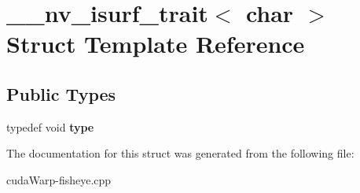 \hypertarget{struct____nv__isurf__trait_3_01char_01_4}{}\section{\+\_\+\+\_\+nv\+\_\+isurf\+\_\+trait$<$ char $>$ Struct Template Reference}
\label{struct____nv__isurf__trait_3_01char_01_4}
\subsection*{Public Types}
\begin{DoxyCompactItemize}
\item 
typedef void {\bfseries type}\hypertarget{struct____nv__isurf__trait_3_01char_01_4_a07f94e484de956d5012d5114e82fbad7}{}\label{struct____nv__isurf__trait_3_01char_01_4_a07f94e484de956d5012d5114e82fbad7}

\end{DoxyCompactItemize}


The documentation for this struct was generated from the following file\+:\begin{DoxyCompactItemize}
\item 
cuda\+Warp-\/fisheye.\+cpp\end{DoxyCompactItemize}
